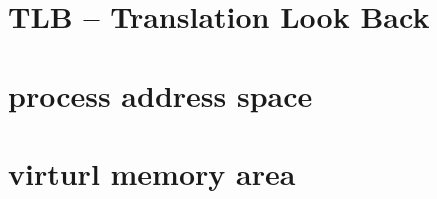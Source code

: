 \section{TLB -- Translation Look Back }
\label{ft}

\section{process address space}

\section{virturl memory area}

































